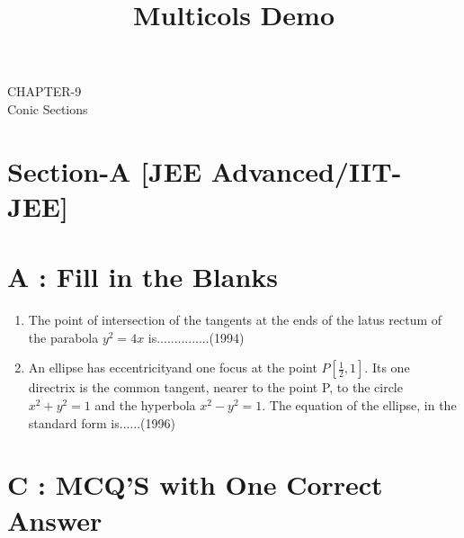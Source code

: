 \documentclass[12pt]{article}
\title{Multicols Demo}
\providecommand{\sbrak}[1]{\ensuremath{{}\left[#1\right]}}
\begin{document}
\begin{center}
\textbf\large{CHAPTER-9 \\ Conic Sections}

\end{center}
\section*{Section-A    [JEE Advanced/IIT-JEE]}
\section*{A    :  Fill in the Blanks}
\begin{enumerate}
\item The point of intersection of the tangents at the ends of the latus rectum of the parabola $y^2=4x$ is...............(1994)
\item An ellipse has eccentricityand one focus at the point $P\sbrak{\frac{1}{2},1}$. Its one directrix is the common tangent, nearer to the point P, to the circle $x^2+y^2=1$ and the hyperbola $x^2-y^2=1$. The equation of the ellipse, in the standard form is......(1996)
\end{enumerate}

\section*{C  :   MCQ'S with One Correct Answer}
\end{document}
